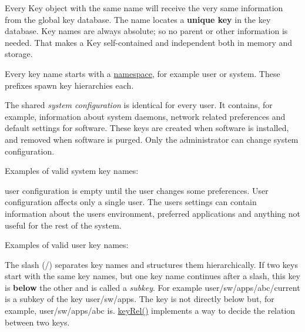 Every {\ttfamily Key} object with the same name will receive the very same information from the global key database. The name locates a {\bfseries unique key} in the key database. Key names are always absolute; so no parent or other information is needed. That makes a {\ttfamily Key} self-\/contained and independent both in memory and storage.

Every key name starts with a \hyperlink{doc_help_elektra-namespaces_md}{namespace}, for example {\ttfamily user} or {\ttfamily system}. These prefixes spawn key hierarchies each.

The shared {\itshape system configuration} is identical for every user. It contains, for example, information about system daemons, network related preferences and default settings for software. These keys are created when software is installed, and removed when software is purged. Only the administrator can change system configuration.

Examples of valid system key names\+:




user configuration is empty until the user changes some preferences. User configuration affects only a single user. The user\textquotesingle{}s settings can contain information about the user\textquotesingle{}s environment, preferred applications and anything not useful for the rest of the system.

Examples of valid user key names\+:




The slash ({\ttfamily /}) separates key names and structures them hierarchically. If two keys start with the same key names, but one key name continues after a slash, this key is {\bfseries below} the other and is called a {\itshape subkey}. For example {\ttfamily user/sw/apps/abc/current} is a subkey of the key {\ttfamily user/sw/apps}. The key is not directly below but, for example, {\ttfamily user/sw/apps/abc} is. {\ttfamily \hyperlink{group__keytest_ga6bb0f95ac34ce9c42d61bb35a76139d0}{key\+Rel()}} implements a way to decide the relation between two keys.

